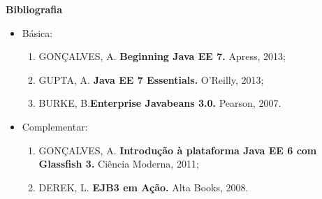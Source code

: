 



\begin{snugshade}\begin{center}\textbf{
    Bibliografia
}\end{center}\end{snugshade}

\begin{itemize} 
  \item Básica:
	\begin{enumerate}
	\item 	GONÇALVES, A. \textbf{Beginning Java EE 7.} Apress, 2013;
	\item 	GUPTA, A. \textbf{Java EE 7 Essentials.} O’Reilly, 2013;
	\item 	BURKE, B.\textbf{Enterprise Javabeans 3.0.} Pearson, 2007. 
	\end{enumerate}
  \item Complementar:
	\begin{enumerate} 
	\item 	GONÇALVES, A. \textbf{Introdução à plataforma Java EE 6 com Glassfish 3.} Ciência Moderna, 2011;
	\item 	DEREK, L. \textbf{EJB3 em Ação.} Alta Books, 2008.
	\end{enumerate}
\end{itemize}
